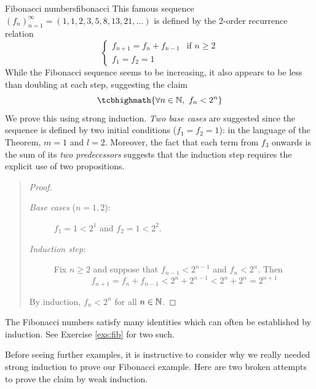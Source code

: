 \begin{example}{Fibonacci numbers}{fibonacci}
	This famous sequence $(f_n)_{n=1}^\infty=(1,1,2,3,5,8,13,21,\ldots)$ is defined by the 2\nd-order recurrence relation
	\[
		\begin{cases}
			f_{n+1}=f_n+f_{n-1}&\text{if }n\ge 2\\
			f_1=f_2=1&
		\end{cases}
	\]
	While the Fibonacci sequence seems to be increasing, it also appears to be less than doubling at each step, suggesting the claim
	\[
		\tcbhighmath{\forall n\in\N,\ f_n<2^n}
	\]
	We prove this using strong induction. \emph{Two base cases} are suggested since the sequence is defined by two initial conditions ($f_1=f_2=1$): in the language of the Theorem, $m=1$ and $l=2$. Moreover, the fact that each term from $f_3$ onwards is the sum of its \emph{two predecessors} suggests that the induction step requires the explicit use of two propositions.
	\begin{quote}
		\begin{proof}
			\begin{description}
				\item[\normalfont\emph{Base cases} ($n=1,2$):] $f_1=1<2^1$ and $f_2=1<2^2$.
				\item[\normalfont\emph{Induction step}:] Fix $n\ge 2$ and suppose\footnotemark{} that $f_{n-1}<2^{n-1}$ and $f_n<2^n$. Then
				\[
					f_{n+1}=f_n+f_{n-1}<2^n+2^{n-1}<2^n+2^n=2^{n+1}
				\]
			\end{description} 
			By induction, $f_n<2^n$ for all $n\in\mathbb{N}$.
		\end{proof}
	\end{quote}
	The Fibonacci numbers satisfy many identities which can often be established by induction. See Exercise \ref{exs:fib} for two such.
\end{example}

\vspace{-5pt}


\goodbreak

Before seeing further examples, it is instructive to consider why we really needed strong induction to prove our Fibonacci example. Here are two broken attempts to prove the claim by weak induction.

